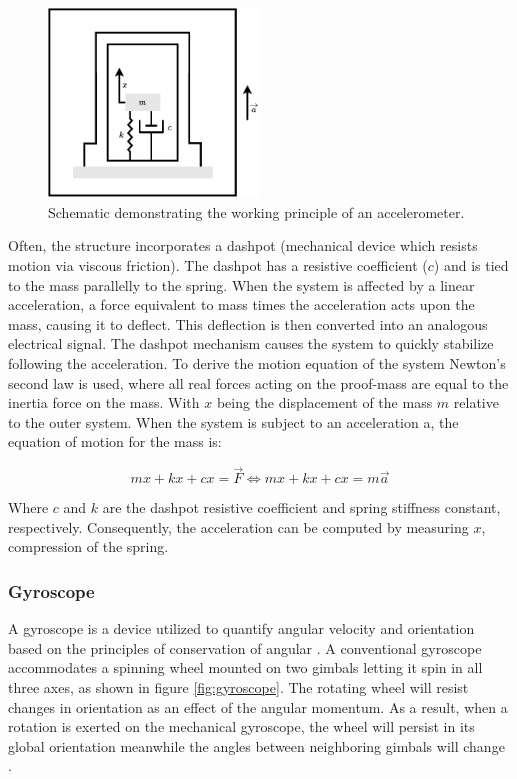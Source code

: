 \begin{figure}[!h]
  \centering
  \includegraphics[width=0.5\textwidth]{figures/accelerometer.pdf}
  \caption{Schematic demonstrating the working principle of an accelerometer. \cite{roylance1979batch} }
  \label{fig:accelerometer_schematic}
\end{figure}

Often, the structure incorporates a dashpot (mechanical device which resists motion via viscous friction). The dashpot has a resistive coefficient ($c$) and is tied to the mass parallelly to the spring. When the system is affected by a linear acceleration, a force equivalent to mass times the acceleration acts upon the mass, causing it to deflect. This deflection is then converted into an analogous electrical signal. The dashpot mechanism causes the system to quickly stabilize following the acceleration. To derive the motion equation of the system Newton's second law is used, where all real forces acting on the proof-mass are equal to the inertia force on the mass. With $x$ being the displacement of the mass $m$ relative to the outer system. When the system is subject to an acceleration a, the equation of motion for the mass is:

\begin{equation}
  mx + kx + cx = \overrightarrow{F}\Leftrightarrow mx + kx + cx = m\overrightarrow{a}
\end{equation}

Where $c$ and $k$ are the dashpot resistive coefficient and spring stiffness constant, respectively. Consequently, the acceleration can be computed by measuring $x$, compression of the spring.


\subsubsection{Gyroscope}

A gyroscope is a device utilized to quantify angular velocity and orientation based on the principles of conservation of angular  \cite{zhuang2020introductory}. A conventional gyroscope accommodates a spinning wheel mounted on two gimbals letting it spin in all three axes, as shown in figure \ref{fig:gyroscope}. The rotating wheel will resist changes in orientation as an effect of the angular momentum. As a result, when a rotation is exerted on the mechanical gyroscope, the wheel will persist in its global orientation meanwhile the angles between neighboring gimbals will change \cite{marotto2013orientation}.

